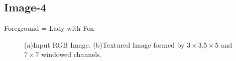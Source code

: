 \documentclass{article}
\begin{document}
\newpage
\subsection{Image-4}
Foreground = Lady with Fox\\
\begin{figure}[!htbp]
     \centering
     \captionsetup[subfigure]{labelformat=empty}
    \caption{(a)Input RGB Image. (b)Textured Image formed by $3\times 3$,$5\times 5$ and $7\times 7$ windowed channels.}
\end{figure}
\end{document}
